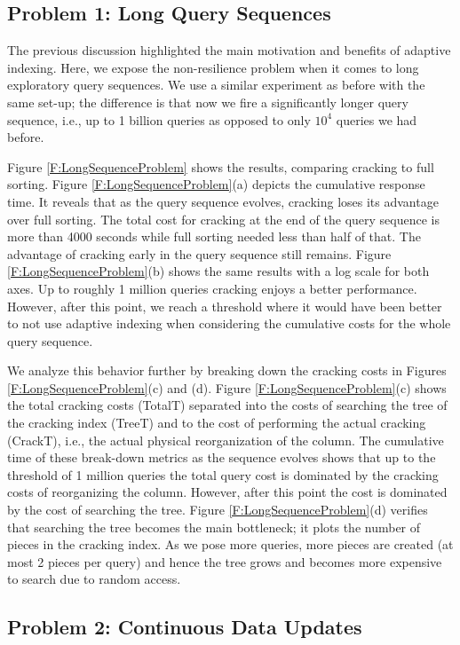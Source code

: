 \subsection{Problem 1: Long Query Sequences}
The previous discussion highlighted the main motivation and benefits of adaptive indexing.
Here, we expose the non-resilience problem when it comes to long exploratory query sequences.
We use a similar experiment as before with the same set-up;
the difference is that now we fire a significantly longer query sequence, i.e., up to 1 
billion queries as opposed to only $10^4$  queries we had before.

Figure \ref{F:LongSequenceProblem} shows the results, comparing cracking to full sorting.
Figure \ref{F:LongSequenceProblem}(a) depicts the cumulative response time.
It reveals that as the query sequence evolves, cracking loses its advantage over full sorting. 
The total cost for cracking at the end of the query sequence is more than 4000 seconds while 
full sorting needed less than half of that. The advantage of cracking early in the query sequence still remains. 
Figure \ref{F:LongSequenceProblem}(b) shows the same results with 
a log scale for both axes.
Up to roughly 1 million queries cracking enjoys a better performance. 
However, after this point, we reach a threshold where it would have been better to not use adaptive indexing
when considering the cumulative costs for the whole query sequence.

We analyze this behavior further by breaking down the cracking costs
in Figures \ref{F:LongSequenceProblem}(c) and (d). 
Figure \ref{F:LongSequenceProblem}(c) shows the total cracking costs (TotalT)
separated into the costs of searching the tree of the cracking index (TreeT) and to the cost of performing the actual cracking (CrackT),
i.e., the actual physical reorganization of the column. 
The cumulative time of these break-down metrics 
as the sequence evolves shows that
up to the threshold of 1 million queries the total query cost is dominated by the cracking costs of reorganizing the column.
However, after this point the cost is dominated by the cost of searching the tree.
Figure \ref{F:LongSequenceProblem}(d) verifies that searching the tree becomes the main bottleneck;
it plots the number of pieces in the cracking index. As we pose more queries, more pieces are created (at most 2 pieces per query)
and hence the tree grows and becomes more expensive to search due to random access.



\subsection{Problem 2: Continuous Data Updates}

